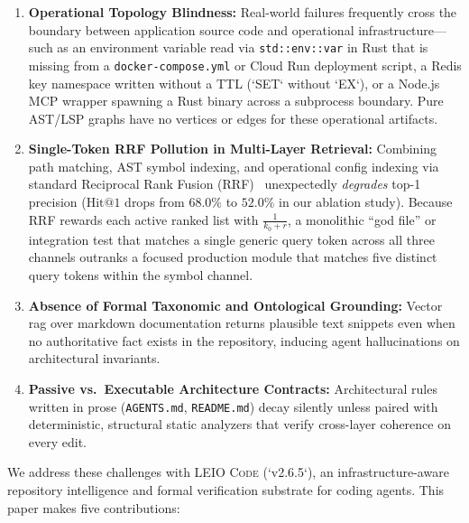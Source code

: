 \documentclass[11pt]{article}
\begin{document}
\begin{enumerate}
    \item \textbf{Operational Topology Blindness:} Real-world failures frequently cross the boundary between application source code and operational infrastructure—such as an environment variable read via \texttt{std::env::var} in Rust that is missing from a \texttt{docker-compose.yml} or Cloud Run deployment script, a Redis key namespace written without a TTL (`SET` without `EX`), or a Node.js MCP wrapper spawning a Rust binary across a subprocess boundary. Pure AST/LSP graphs have no vertices or edges for these operational artifacts.
    \item \textbf{Single-Token RRF Pollution in Multi-Layer Retrieval:} Combining path matching, AST symbol indexing, and operational config indexing via standard Reciprocal Rank Fusion (RRF)~\cite{cormack2009reciprocal} unexpectedly \emph{degrades} top-1 precision ($\text{Hit@1}$ drops from $68.0\%$ to $52.0\%$ in our ablation study). Because RRF rewards each active ranked list with $\frac{1}{k_0 + r}$, a monolithic ``god file'' or integration test that matches a single generic query token across all three channels outranks a focused production module that matches five distinct query tokens within the symbol channel.
    \item \textbf{Absence of Formal Taxonomic and Ontological Grounding:} Vector rag over markdown documentation returns plausible text snippets even when no authoritative fact exists in the repository, inducing agent hallucinations on architectural invariants.
    \item \textbf{Passive vs.\ Executable Architecture Contracts:} Architectural rules written in prose (\texttt{AGENTS.md}, \texttt{README.md}) decay silently unless paired with deterministic, structural static analyzers that verify cross-layer coherence on every edit.
\end{enumerate}

We address these challenges with \textsc{LEIO Code} (`v2.6.5`), an infrastructure-aware repository intelligence and formal verification substrate for coding agents. This paper makes five contributions:
\end{document}
